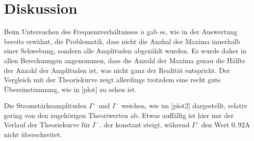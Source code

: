 \section{Diskussion}
\label{sec:Diskussion}

Beim Untersuchen des Frequenzverhältnisses $n$ gab es, wie in der Auswertung bereits erwähnt, die Problematik, dass nicht die Anzhal der 
Maxima innerhalb einer Schwebung, sondern alle Amplituden abgezählt wurden. Es wurde daher in allen Berechnungen angenommen, dass die 
Anzahl der Maxima genau die Hälfte der Anzahl der Amplituden ist, was nicht ganz der Realität entspricht. Der Vergleich mit der 
Theoriekurve zeigt allerdings trotzdem eine recht gute Übereinstimmung, wie in [plot] zu sehen ist.

Die Stromstärkeamplituden $I^+$ und $I^-$ weichen, wie im [plot2] dargestellt, relativ gering von den zugehörigen Theoriwerten ab.
Etwas auffällig ist hier nur der Verlauf der Theoriekurve für $I^-$, der konstant steigt, während $I^+$ den Wert $0,92\si{\ampere}$
nicht überschreitet.
